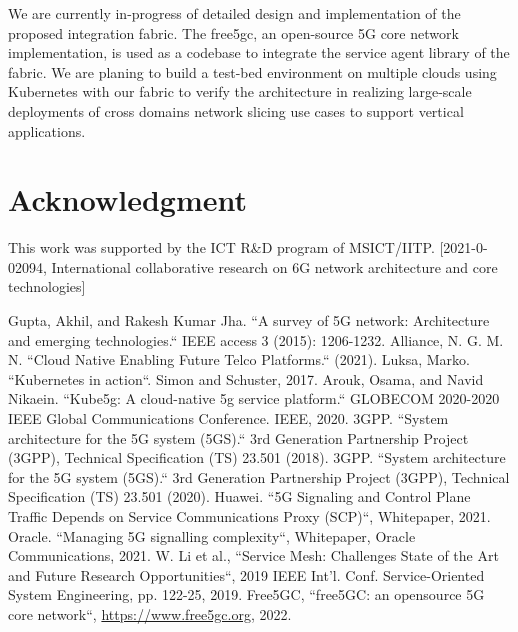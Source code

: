 \documentclass[conference]{IEEEtran}
\begin{document}
We are currently in-progress of detailed design and implementation of the
proposed integration fabric. The free5gc\cite{free5gc}, an open-source 5G core
network implementation, is used as a codebase to integrate the service agent
library of the fabric. We are planing to build a test-bed environment on
multiple clouds using Kubernetes with our fabric to verify the architecture in
realizing large-scale deployments of cross domains network slicing use cases to
support vertical applications.

\section*{Acknowledgment}

This work was supported by the ICT R\&D program of MSICT/IITP. [2021-0-02094,
International collaborative research on 6G network architecture and core
technologies]


\begin{thebibliography}{00}
 Gupta, Akhil, and Rakesh Kumar Jha. ``A survey of 5G network: Architecture and emerging technologies.`` IEEE access 3 (2015): 1206-1232.
 Alliance, N. G. M. N. ``Cloud Native Enabling Future Telco Platforms.`` (2021).
 Luksa, Marko. ``Kubernetes in action``. Simon and Schuster, 2017.
 Arouk, Osama, and Navid Nikaein. ``Kube5g: A cloud-native 5g service platform.`` GLOBECOM 2020-2020 IEEE Global Communications Conference. IEEE, 2020.
 3GPP. ``System architecture for the 5G system (5GS).`` 3rd Generation Partnership Project (3GPP), Technical Specification (TS) 23.501 (2018).
 3GPP. ``System architecture for the 5G system (5GS).`` 3rd Generation Partnership Project (3GPP), Technical Specification (TS) 23.501 (2020).
 Huawei. ``5G Signaling and Control Plane Traffic Depends on Service Communications Proxy (SCP)``, Whitepaper, 2021.
 Oracle. ``Managing 5G signalling complexity``, Whitepaper, Oracle Communications, 2021.
 W. Li et al., ``Service Mesh: Challenges State of the Art and Future Research Opportunities``, 2019 IEEE Int'l. Conf. Service-Oriented System Engineering, pp. 122-25, 2019.
 Free5GC, ``free5GC: an opensource 5G core network``, \url{https://www.free5gc.org}, 2022.
\end{thebibliography}
\end{document}
